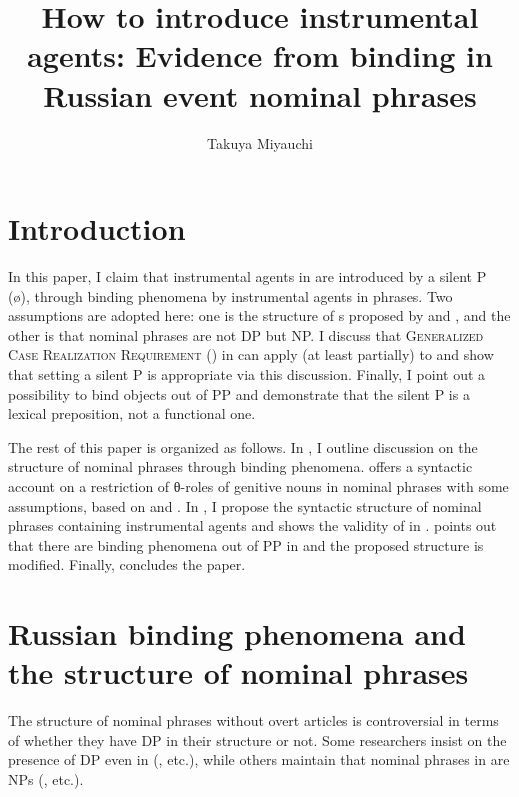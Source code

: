 \documentclass[output=paper,colorlinks,citecolor=brown,newtxmath]{langsci/langscibook}
\title{How to introduce instrumental agents: Evidence from binding in Russian event nominal phrases}
\author{ Takuya Miyauchi\affiliation{Tokyo University of Foreign Studies and\\Japan Society for the Promotion of Science}}
\begin{document}
%
\maketitle
{}
\section{Introduction}
In this paper, I claim that instrumental agents in  are introduced by a silent P (ø), through binding phenomena by instrumental agents in  phrases. Two assumptions are adopted here: one is the structure of s proposed by \cite{MiyauchiIto2016} and \cite{Miyauchi2017b}, and the other is that  nominal phrases are not DP but NP. I discuss that \textsc{Generalized Case Realization Requirement} () in  \citep{Horvath2014} can apply (at least partially) to  and show that setting a silent P is appropriate via this discussion. Finally, I point out a possibility to bind objects out of PP and demonstrate that the silent P is a lexical preposition, not a functional one.


The rest of this paper is organized as follows. In , I outline discussion on the structure of nominal phrases through   binding phenomena.  offers a syntactic account on a restriction of θ-roles of genitive nouns in  nominal phrases with some assumptions, based on \cite{MiyauchiIto2016} and \cite{Miyauchi2017b}. In , I propose the syntactic structure of  nominal phrases containing instrumental agents and  shows the validity of  in .  points out that there are binding phenomena out of PP in  and the proposed structure is modified. Finally,  concludes the paper.

\section{Russian binding phenomena and the structure of nominal phrases}\label{sec:BIND}

The structure of  nominal phrases without overt articles is controversial in terms of whether they have DP in their structure or not. Some researchers insist on the presence of DP even in  (\citealt{Progovac1998,Rappaport2002,Rutkowski2002,Basic2004,FranksPereltsvaig2004,Pereltsvaig2007a,RutokowskiMaliszewska2007,Laterza2016}, etc.), while others maintain that nominal phrases in  are NPs (\citealt{Zlatic1998,Trenkic2004,Boskovic2005,Boskovic2007dpnp,Boskovic2009,Petrovic2011,despic2013}, etc.).
\end{document}
